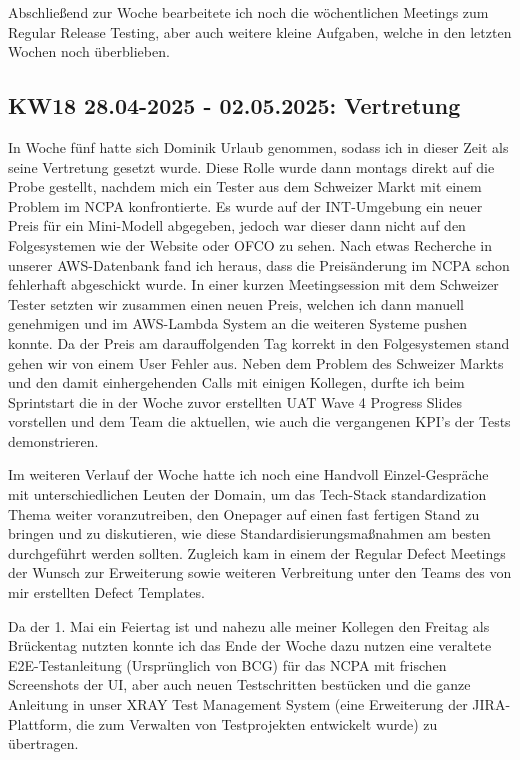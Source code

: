 Abschließend zur Woche bearbeitete ich noch die wöchentlichen Meetings zum Regular Release Testing, aber auch weitere kleine Aufgaben, welche in den letzten Wochen noch überblieben.


\subsection{KW18 28.04-2025 - 02.05.2025: Vertretung}
In Woche fünf hatte sich Dominik Urlaub genommen, sodass ich in dieser Zeit als seine Vertretung gesetzt wurde. 
Diese Rolle wurde dann montags direkt auf die Probe gestellt, nachdem mich ein Tester aus dem Schweizer Markt mit einem Problem im \ac{NCPA} konfrontierte. 
Es wurde auf der \ac{INT}-Umgebung ein neuer Preis für ein Mini-Modell abgegeben, jedoch war dieser dann nicht auf den Folgesystemen wie der Website oder \ac{OFCO} zu sehen. 
Nach etwas Recherche in unserer \ac{AWS}-Datenbank fand ich heraus, dass die Preisänderung im \ac{NCPA} schon fehlerhaft abgeschickt wurde. 
In einer kurzen Meetingsession mit dem Schweizer Tester setzten wir zusammen einen neuen Preis, welchen ich dann manuell genehmigen und im \ac{AWS}-Lambda System an die weiteren Systeme pushen konnte. 
Da der Preis am darauffolgenden Tag korrekt in den Folgesystemen stand gehen wir von einem User Fehler aus. 
Neben dem Problem des Schweizer Markts und den damit einhergehenden Calls mit einigen Kollegen, durfte ich beim Sprintstart die in der Woche zuvor erstellten \ac{UAT} Wave 4 Progress Slides vorstellen und dem Team die aktuellen, wie auch die vergangenen KPI’s der Tests demonstrieren.

Im weiteren Verlauf der Woche hatte ich noch eine Handvoll Einzel-Gespräche mit unterschiedlichen Leuten der Domain, um das Tech-Stack standardization Thema weiter voranzutreiben, den Onepager auf einen fast fertigen Stand zu bringen und zu diskutieren, wie diese Standardisierungsmaßnahmen am besten durchgeführt werden sollten. 
Zugleich kam in einem der Regular Defect Meetings der Wunsch zur Erweiterung sowie weiteren Verbreitung unter den Teams des von mir erstellten Defect Templates.

Da der 1. Mai ein Feiertag ist und nahezu alle meiner Kollegen den Freitag als Brückentag nutzten konnte ich das Ende der Woche dazu nutzen eine veraltete \ac{E2E}-Testanleitung (Ursprünglich von BCG) für das \ac{NCPA} mit frischen Screenshots der UI, aber auch neuen Testschritten bestücken und die ganze Anleitung in unser XRAY Test Management System (eine Erweiterung der JIRA-Plattform, die zum Verwalten von Testprojekten entwickelt wurde) zu übertragen.

